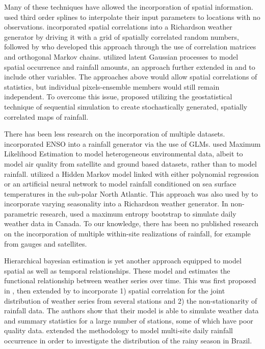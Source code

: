 \documentclass[11pt]{article}
\begin{document}
Many of these techniques have allowed the incorporation of spatial information. \cite{Jones1993} used third order splines to interpolate their input parameters to locations with no observations. \cite{Wilks1998} incorporated spatial correlations into a Richardson weather generator by driving it with a grid of spatially correlated random numbers, followed by \cite{Baigorria2010} who developed this approach through the use of correlation matrices and orthogonal Markov chains.  \cite{Kleiber2012} utilized latent Gaussian processes to model spatial occurrence and rainfall amounts, an approach further extended in \cite{Kleiber2012} and \cite{Verdin2015} to include other variables. The approaches above would allow spatial correlations of statistics, but individual pixels-ensemble members would still remain independent. To overcome this issue, \cite{Greatrex2012} proposed utilizing the geostatistical technique of sequential simulation to create stochastically generated, spatially correlated maps of rainfall. 

There has been less research on the incorporation of multiple datasets. \cite{Furrer2008} incorporated ENSO into a rainfall generator via the use of GLMs. \cite{Fasso2011} used Maximum Likelihood Estimation to model heterogeneous environmental data, albeit to model air quality from satellite and ground based datasets, rather than to model rainfall. \cite{Hauser2013} utilized a Hidden Markov model linked with either polynomial regression or an artificial neural network to model rainfall conditioned on sea surface temperatures in the sub-polar North Atlantic.  This approach was also used by \cite{CareySmith2014} to incorporate varying seasonality into a Richardson weather generator.  In non-parametric research, \cite{Srivastav2015} used a maximum entropy bootstrap to simulate daily weather data in Canada.   To our knowledge, there has been no published research on the incorporation of multiple within-site realizations of rainfall, for example from gauges and satellites. 

Hierarchical bayesian estimation is yet another approach equipped to model spatial as well as temporal relationships.  These model and estimates the functional relationship between weather series over time. This was first proposed in \cite{Sans2015}, then extended by \cite{Sanso2000} to incorporate 1) spatial correlation for the joint distribution of weather series from several stations and 2) the non-stationarity of rainfall data. The authors show that their model is able to simulate weather data and summary statistics for a large number of stations, some of which have poor quality data. \cite{Lima2015} extended the methodology to model multi-site daily rainfall occurrence in order to investigate the distribution of the rainy season in Brazil.   
\end{document}
